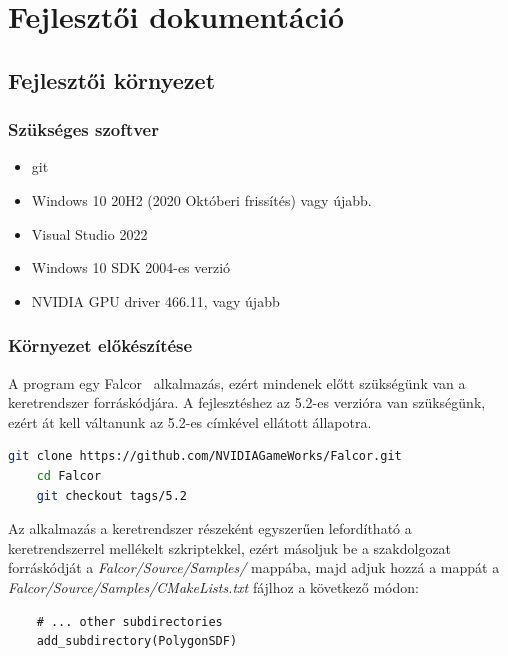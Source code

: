 \chapter{Fejlesztői dokumentáció}
\label{ch:impl}

\section{Fejlesztői környezet}

\subsection{Szükséges szoftver}

\begin{itemize}
	\item git
	\item Windows 10 20H2 (2020 Októberi frissítés) vagy újabb.
	\item Visual Studio 2022
	\item Windows 10 SDK 2004-es verzió
	\item NVIDIA GPU driver 466.11, vagy újabb
\end{itemize}

\subsection{Környezet előkészítése}

A program egy Falcor~\cite{falcor} alkalmazás, ezért mindenek előtt szükségünk van a keretrendszer forráskódjára. A fejlesztéshez az 5.2-es verzióra van szükségünk, ezért át kell váltanunk az 5.2-es címkével ellátott állapotra.

\begin{lstlisting}[language=bash]
	git clone https://github.com/NVIDIAGameWorks/Falcor.git
	cd Falcor
	git checkout tags/5.2
\end{lstlisting}

Az alkalmazás a keretrendszer részeként egyszerűen lefordítható a keretrendszerrel mellékelt szkriptekkel, ezért másoljuk be a szakdolgozat forráskódját a \textit{Falcor/Source/Samples/} mappába, majd adjuk hozzá a mappát a \textit{Falcor/Source/Samples/CMakeLists.txt} fájlhoz a következő módon:
\begin{lstlisting}
	# ... other subdirectories
	add_subdirectory(PolygonSDF)
\end{lstlisting}

